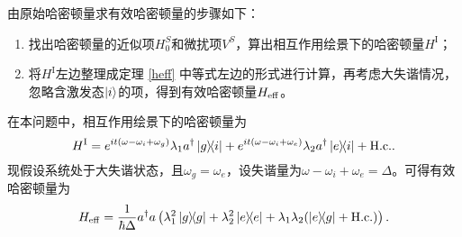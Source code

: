 \documentclass[
fontsetup = font-setup-open.tex,
titlesetup = titles-setup.tex
]{AJbook}
\numberwithin{equation}{section}
\begin{document}
由原始哈密顿量求有效哈密顿量的步骤如下：
\begin{enumerate}
\item 找出哈密顿量的近似项$ H_0^S $和微扰项$ V^S $，算出相互作用绘景下的哈密顿量$ H^\mathrm{I} $；
\item 将$ H^\mathrm{I} $左边整理成定理 \ref{heff} 中等式左边的形式进行计算，再考虑大失谐情况，忽略含激发态$ \ket{i} $的项，得到有效哈密顿量$ H_{\mathrm{eff}} $。
\end{enumerate}
在本问题中，相互作用绘景下的哈密顿量为
\begin{equation}\label{key}
H^\mathrm{I}=e^{it(\omega-\omega_i+\omega_g)}\lambda_1 a^\dagger\ketbra{g}{i}+e^{it(\omega-\omega_i+\omega_e)}\lambda_2 a^\dagger\ketbra{e}{i}+\mathrm{H.c.}.
\end{equation}
现假设系统处于大失谐状态，且$ \omega_g=\omega_e $，设失谐量为$ \omega-\omega_i+\omega_e=\Delta $。可得有效哈密顿量为
\begin{equation}\label{key}
H_{\mathrm{eff}}=\frac{1}{\hbar\Delta}a^\dagger a\left(\lambda_1^2\ketbra{g}{g}+\lambda_2^2\ketbra{e}{e}+\lambda_1\lambda_2(\ketbra{e}{g}+\mathrm{H.c.})\right).
\end{equation}
\end{document}
